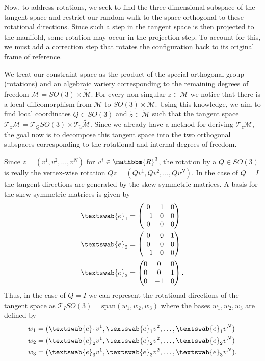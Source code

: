 Now, to address rotations, we seek to find the three dimensional subspace of the tangent space and restrict our random walk to the space orthogonal to these rotational directions. Since such a step in the tangent space is then projected to the manifold, some rotation may occur in the projection step. To account for this, we must add a correction step that rotates the configuration back to its original frame of reference. 

We treat our constraint space as the product of the special orthogonal group (rotations) and an algebraic variety corresponding to the remaining degrees of freedom $\mathcal{M} = SO(3) \times \tilde{\mathcal{M}}$. For every non-singular $z \in \mathcal{M}$ we notice that there is a local diffeomorphism from $\mathcal{M}$ to $SO(3) \times \tilde{\mathcal{M}}$. Using this knowledge, we aim to find local coordinates $Q \in SO(3)$ and $\tilde{z} \in \tilde{\mathcal{M}}$ such that the tangent space $\mathcal{T}_z\mathcal{M} = \mathcal{T}_QSO(3) \times \mathcal{T}_{\tilde{z}}\tilde{\mathcal{M}}$. Since we already have a method for deriving $\mathcal{T}_z\mathcal{M}$, the goal now is to decompose this tangent space into the two orthogonal subspaces corresponding to the rotational and internal degrees of freedom.

Since $z = (v^1, v^2, \dots, v^N)$ for $v^i \in \mathbbm{R}^3$, the rotation by a $Q \in SO(3)$ is really the vertex-wise rotation $\bar{Q}z = (Qv^1, Qv^2, \dots, Qv^N)$. In the case of $Q = I$ the tangent directions are generated by the skew-symmetric matrices. A basis for the skew-symmetric matrices is given by 
\begin{align}
\textswab{e}_1 &= \begin{pmatrix} 0 & 1 & 0 \\ -1 & 0 & 0 \\ 0 & 0 & 0  \end{pmatrix} \\
\textswab{e}_2 &= \begin{pmatrix} 0 & 0 & 1 \\ 0 & 0 & 0 \\ -1 & 0 & 0  \end{pmatrix} \\
\textswab{e}_3 &= \begin{pmatrix} 0 & 0 & 0 \\ 0 & 0 & 1 \\ 0 & -1 & 0  \end{pmatrix}.
\end{align}
Thus, in the case of $Q=I$ we can represent the rotational directions of the tangent space as $\mathcal{T}_ISO(3) = \text{span}(w_1, w_2, w_3)$ where the bases $w_1, w_2, w_3$ are defined by 
\begin{align}
w_1 &= (\textswab{e}_1v^1, \textswab{e}_1v^2, \dots, \textswab{e}_1v^N) \\
w_2 &= (\textswab{e}_2v^1, \textswab{e}_2v^2, \dots, \textswab{e}_2v^N) \\
w_3 &= (\textswab{e}_3v^1, \textswab{e}_3v^2, \dots, \textswab{e}_3v^N).
\end{align}

